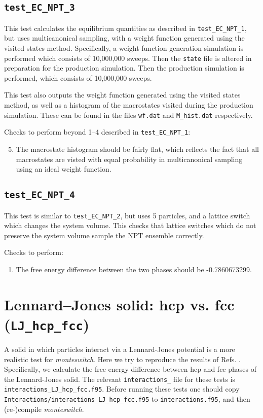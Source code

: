 \documentclass{report}
\begin{document}
\subsection{\texttt{test\_EC\_NPT\_3}}
This test calculates the equilibrium quantities as described in \texttt{test\_EC\_NPT\_1}, but uses multicanonical sampling,
with a weight function generated using the visited states method. Specifically, a weight function generation 
simulation is performed which consists of 10,000,000 sweeps. Then the \texttt{state} file is altered in preparation 
for the production simulation. Then the production simulation is performed, which consists of 10,000,000 sweeps.

This test also outputs the weight function generated using the visited states method, as well as a histogram of 
the macrostates visited during the production simulation. These can be found in the files \texttt{wf.dat} and \texttt{M\_hist.dat}
respectively. 

Checks to perform beyond  1--4 described in \texttt{test\_EC\_NPT\_1}:
\begin{enumerate}
\setcounter{enumi}{4}
\item
The macrostate histogram should be fairly flat, which reflects the fact that all macrostates are
visted with equal probability in multicanonical sampling using an ideal weight function.
\end{enumerate}


\subsection{\texttt{test\_EC\_NPT\_4}}
This test is similar to \texttt{test\_EC\_NPT\_2}, but uses 5 particles, and a lattice switch which changes the system volume.
This checks that lattice switches which do not preserve the system volume sample the NPT ensemble correctly.

Checks to perform:
\begin{enumerate}
\item
The free energy difference between the two phases should be -0.7860673299.
\end{enumerate}


\section{Lennard--Jones solid: hcp vs. fcc (\texttt{LJ\_hcp\_fcc})}
A solid in which particles interact via a Lennard-Jones potential is a more realistic test for \emph{monteswitch}.
Here we try to reproduce the results of Refs. \cite{thesis:Jackson,Jackson_2002}. Specifically, we calculate the free energy
difference between hcp and fcc phases of the Lennard-Jones solid. The relevant \texttt{interactions\_} file for these tests is 
\texttt{interactions\_LJ\_hcp\_fcc.f95}. Before running these tests one should copy \texttt{Interactions/interactions\_LJ\_hcp\_fcc.f95}
to \texttt{interactions.f95}, and then (re-)compile \emph{monteswitch}.
\end{document}
